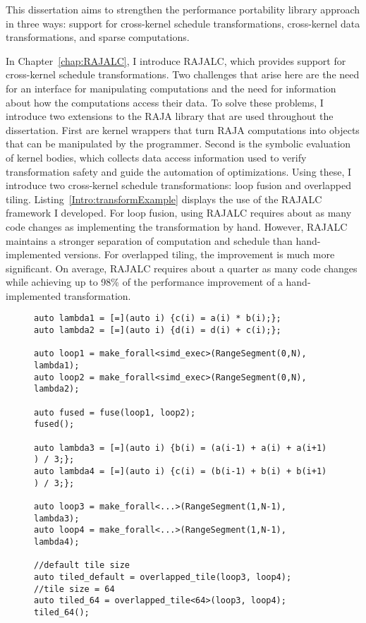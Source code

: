 This dissertation aims to strengthen the performance portability library approach in three ways: support for cross-kernel schedule transformations, cross-kernel data transformations, and sparse computations.

In Chapter~\ref{chap:RAJALC}, I introduce RAJALC, which provides support for cross-kernel schedule transformations.
Two challenges that arise here are the need for an interface for manipulating computations and the need for information about how the computations access their data.
To solve these problems, I introduce two extensions to the RAJA library that are used throughout the dissertation.
First are kernel wrappers that turn RAJA computations into objects that can be manipulated by the programmer.
Second is the symbolic evaluation of kernel bodies, which collects data access information used to verify transformation safety and guide the automation of optimizations.
Using these, I introduce two cross-kernel schedule transformations: loop fusion and overlapped tiling. 
Listing~\ref{Intro:transformExample} displays the use of the RAJALC framework I developed.
For loop fusion, using RAJALC requires about as many code changes as implementing the transformation by hand.
However, RAJALC maintains a stronger separation of computation and schedule than hand-implemented versions.
For overlapped tiling, the improvement is much more significant.
On average, RAJALC requires about a quarter as many code changes while achieving up to 98\% of the performance improvement of a hand-implemented transformation.
\begin{figure}[t]
\begin{lstlisting}[caption={Using the \texttt{fuse} and \texttt{overlapped\_tile} transformations.}, label={Intro:transformExample}]
auto lambda1 = [=](auto i) {c(i) = a(i) * b(i);};
auto lambda2 = [=](auto i) {d(i) = d(i) + c(i);};

auto loop1 = make_forall<simd_exec>(RangeSegment(0,N), lambda1);
auto loop2 = make_forall<simd_exec>(RangeSegment(0,N), lambda2);

auto fused = fuse(loop1, loop2);
fused();

auto lambda3 = [=](auto i) {b(i) = (a(i-1) + a(i) + a(i+1) ) / 3;};
auto lambda4 = [=](auto i) {c(i) = (b(i-1) + b(i) + b(i+1) ) / 3;};

auto loop3 = make_forall<...>(RangeSegment(1,N-1), lambda3);
auto loop4 = make_forall<...>(RangeSegment(1,N-1), lambda4);

//default tile size
auto tiled_default = overlapped_tile(loop3, loop4);
//tile size = 64
auto tiled_64 = overlapped_tile<64>(loop3, loop4);
tiled_64();
\end{lstlisting}
\end{figure}

